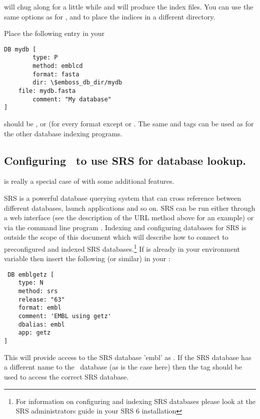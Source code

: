 \documentclass{report}
\begin{document}
 will chug along for a little while and will
produce the index files. You can use the same 
options as for , and
 to place the indices in a different directory.

Place the following entry in your 

\begin{verbatim}
DB mydb [
        type: P
        method: emblcd
        format: fasta
        dir: \$emboss_db_dir/mydb
	file: mydb.fasta
        comment: "My database"
]
\end{verbatim}

 should be ,  or
 (for every format except  or
. The same  and  tags can
be used as for the other database indexing programs.


\subsection{Configuring \EMBOSS\ to use SRS for database lookup.}

 is really a special case of  with some additional features.

SRS is a powerful database querying system that can cross reference
between different databases, launch applications and so on. SRS can be
run either through a web interface (see the description of the URL
method above for an example) or via the command line program
.  Indexing and configuring databases for SRS is
outside the scope of this document which will describe how to connect
to preconfigured and indexed SRS databases.\footnote{For information
on configuring and indexing SRS databases please look at the SRS
administrators guide  in your SRS 6
installation} If  is already in your 
environment variable then insert the following (or similar) in your
:

\begin{verbatim}
 DB emblgetz [ 
    type: N 
    method: srs 
    release: "63" 
    format: embl
    comment: 'EMBL using getz' 
    dbalias: embl 
    app: getz 
]
\end{verbatim}

This will provide access to the SRS database 'embl' as
. If the SRS database has a different name to the
\EMBOSS\ database (as is the case here) then the  tag
should be used to access the correct SRS database.
\end{document}
